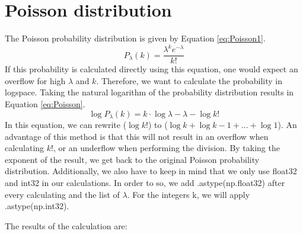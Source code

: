 \section{Poisson distribution}

The Poisson probability distribution is given by Equation \ref{eq:Poisson1}. 
\begin{equation}\label{eq:Poisson1}
    P_{\lambda}(k) = \frac{\lambda^k e^{-\lambda}}{k!}
\end{equation}
If this probability is calculated directly using this equation, one would expect an overflow for high $\lambda$ and $k$. Therefore, we want to calculate the probability in logspace. Taking the natural logarithm of the probability distribution results in Equation \ref{eq:Poisson}. 
\begin{equation}\label{eq:Poisson}
    \log{P_{\lambda}(k)} = k \cdot \log{\lambda} - \lambda - \log{k!}
\end{equation}
In this equation, we can rewrite ($\log{k!}$) to ($\log{k} + \log{k-1} + ... + \log{1}$). An advantage of this method is that this will not result in an overflow when calculating $k!$, or an underflow when performing the division. By taking the exponent of the result, we get back to the original Poisson probability distribution. Additionally, we also have to keep in mind that we only use float32 and int32 in our calculations. In order to so, we add .astype(np.float32) after every calculating and the list of $\lambda$. For the integers k, we will apply .astype(np.int32). 

The results of the calculation are: 


